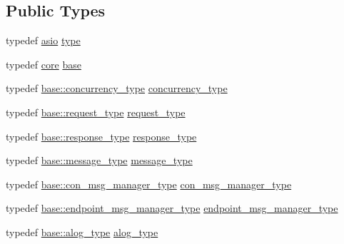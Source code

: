 \subsection*{Public Types}
\begin{DoxyCompactItemize}
\item 
typedef \hyperlink{structwebsocketpp_1_1config_1_1asio}{asio} \hyperlink{structwebsocketpp_1_1config_1_1asio_a14c6f9da27b459266c165df5f40e4ba1}{type}
\item 
typedef \hyperlink{structwebsocketpp_1_1config_1_1core}{core} \hyperlink{structwebsocketpp_1_1config_1_1asio_a7f88d72d2fdfa55bd0c96e45709f8199}{base}
\item 
typedef \hyperlink{structwebsocketpp_1_1config_1_1core_a894e9dea6f10e890ea21a687607c2f70}{base\+::concurrency\+\_\+type} \hyperlink{structwebsocketpp_1_1config_1_1asio_a4f2036249aa6a4a627ac42cc38cdaa06}{concurrency\+\_\+type}
\item 
typedef \hyperlink{structwebsocketpp_1_1config_1_1core_a6b17eee7cb81f247afc8f3d7b3a3fc9e}{base\+::request\+\_\+type} \hyperlink{structwebsocketpp_1_1config_1_1asio_ab378f1fa9cdbf4736b0202666c9abe53}{request\+\_\+type}
\item 
typedef \hyperlink{structwebsocketpp_1_1config_1_1core_a08e9a1d498f9002cbabcb1102df6005b}{base\+::response\+\_\+type} \hyperlink{structwebsocketpp_1_1config_1_1asio_a2336ebfd28c36b1e66257ae57ad5296c}{response\+\_\+type}
\item 
typedef \hyperlink{structwebsocketpp_1_1config_1_1core_afb4c134e0a311beebe31a50458855279}{base\+::message\+\_\+type} \hyperlink{structwebsocketpp_1_1config_1_1asio_a89136a9c3a37041226d8d2aaea90fdb1}{message\+\_\+type}
\item 
typedef \hyperlink{structwebsocketpp_1_1config_1_1core_a9f19abdae7b74d1595b410ea47f3e0d8}{base\+::con\+\_\+msg\+\_\+manager\+\_\+type} \hyperlink{structwebsocketpp_1_1config_1_1asio_a3473cd31498718e4cc11d5b34f71d4e6}{con\+\_\+msg\+\_\+manager\+\_\+type}
\item 
typedef \hyperlink{structwebsocketpp_1_1config_1_1core_ac2a5caeef488e2f177bb8f92a37d2f34}{base\+::endpoint\+\_\+msg\+\_\+manager\+\_\+type} \hyperlink{structwebsocketpp_1_1config_1_1asio_a5cc654513cddc3bc7d15ed37b2427150}{endpoint\+\_\+msg\+\_\+manager\+\_\+type}
\item 
typedef \hyperlink{structwebsocketpp_1_1config_1_1core_a3b2c116aa4077f10b085f008b48028e2}{base\+::alog\+\_\+type} \hyperlink{structwebsocketpp_1_1config_1_1asio_a128280d7b2ff8256e10f23050a89549d}{alog\+\_\+type}
\item 

\end{DoxyCompactItemize}
